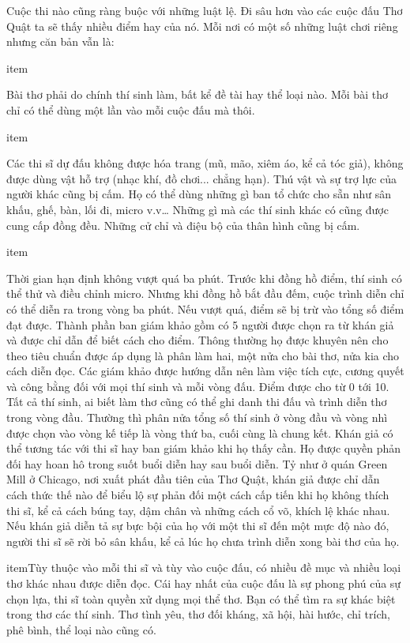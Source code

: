 \documentclass[../main.tex]{subfiles}
\begin{document}
\begin{multicols}{2}
Cuộc thi nào cũng ràng buộc với những luật lệ. Đi sâu hơn vào các cuộc đấu Thơ Quật ta sẽ thấy nhiều điểm hay của nó. Mỗi nơi có một số những luật chơi riêng nhưng căn bản vẫn là:  
\begin{itemize}

item{Bài thơ phải do chính thí sinh làm, bất kể đề tài hay thể loại nào. Mỗi bài thơ chỉ có thể dùng một lần vào mỗi cuộc đấu mà thôi.


}

item{Các thi sĩ dự đấu không được hóa trang (mũ, mão, xiêm áo, kể cả tóc giả), không được dùng vật hỗ trợ (nhạc khí, đồ chơi... chẳng hạn). Thú vật và sự trợ lực của người khác cũng bị cấm. Họ có thể dùng những gì ban tổ chức cho sẵn như sân khấu, ghế, bàn, lối đi, micro v.v… Những gì mà các thí sinh khác có cũng được cung cấp đồng đều. Những cử chỉ và điệu bộ của thân hình cũng bị cấm.


}

item{Thời gian hạn định không vượt quá ba phút. Trước khi đồng hồ điểm, thí sinh có thể thử và điều chỉnh micro. Nhưng khi đồng hồ bắt đầu đếm, cuộc trình diễn chỉ có thể diễn ra trong vòng ba phút. Nếu vượt quá, điểm sẽ bị trừ vào tổng số điểm đạt được. Thành phần ban giám khảo gồm có 5 người được chọn ra từ khán giả và được chỉ dẫn để biết cách cho điểm. Thông thường họ được khuyên nên cho theo tiêu chuẩn được áp dụng là phân làm hai, một nửa cho bài thơ, nửa kia cho cách diễn đọc. Các giám khảo được hướng dẫn nên làm việc tích cực, cương quyết và công bằng đối với mọi thí sinh và mỗi vòng đấu. Điểm được cho từ 0 tới 10. Tất cả thí sinh, ai biết làm thơ cũng có thể ghi danh thi đấu và trình diễn thơ trong vòng đầu. Thường thì phân nửa tổng số thí sinh ở vòng đầu và vòng nhì được chọn vào vòng kế tiếp là vòng thứ ba, cuối cùng là chung kết. Khán giả có thể tương tác với thi sĩ hay ban giám khảo khi họ thấy cần. Họ được quyền phản đối hay hoan hô trong suốt buổi diễn hay sau buổi diễn. Tỷ như ở quán Green Mill ở Chicago, nơi xuất phát đầu tiên của Thơ Quật, khán giả được chỉ dẫn cách thức thế nào để biểu lộ sự phản đối một cách cấp tiến khi họ không thích thi sĩ, kể cả cách búng tay, dậm chân và những cách cổ võ, khích lệ khác nhau. Nếu khán giả diễn tả sự bực bội của họ với một thi sĩ đến một mực độ nào đó, người thi sĩ sẽ rời bỏ sân khấu, kể cả lúc họ chưa trình diễn xong bài thơ của họ.


}

item{Tùy thuộc vào mỗi thi sĩ và tùy vào cuộc đấu, có nhiều đề mục và nhiều loại thơ khác nhau được diễn đọc. Cái hay nhất của cuộc đấu là sự phong phú của sự chọn lựa, thi sĩ toàn quyền xử dụng mọi thể thơ. Bạn có thể tìm ra sự khác biệt trong thơ các thí sinh. Thơ tình yêu, thơ đối kháng, xã hội, hài hước, chỉ trích, phê bình, thể loại nào cũng có. }


\end{itemize}
\end{multicols}
\end{document}
